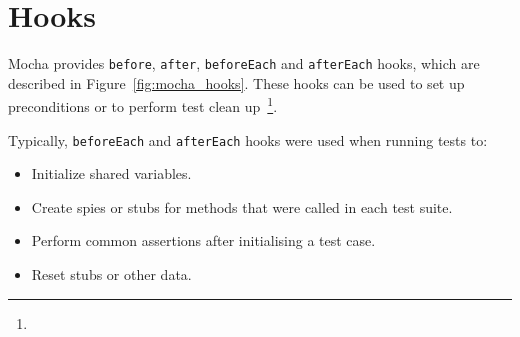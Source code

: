 \section{Hooks} {
\label{sec:testing_hooks}

	Mocha provides \texttt{before}, \texttt{after}, \texttt{beforeEach} and \texttt{afterEach} hooks, which are described in Figure~\ref{fig:mocha_hooks}. These hooks can be used to set up preconditions or to perform test clean up~\footnote{}.

	

	Typically, \texttt{beforeEach} and \texttt{afterEach} hooks were used when running tests to:

	\begin{itemize}
		\item Initialize shared variables.
		\item Create spies or stubs for methods that were called in each test suite.
		\item Perform common assertions after initialising a test case.
		\item Reset stubs or other data.
	\end{itemize}

}

